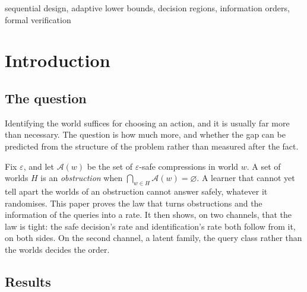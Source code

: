 \begin{IEEEkeywords}
sequential design, adaptive lower bounds, decision regions, information orders, formal
verification
\end{IEEEkeywords}

\section{Introduction}
\label{sec:intro}

\subsection{The question}

Identifying the world suffices for choosing an action, and it is usually far more than
necessary. The question is how much more, and whether the gap can be predicted from the
structure of the problem rather than measured after the fact.

Fix $\varepsilon$, and let $\mathcal A(w)$ be the set of $\varepsilon$-safe compressions in
world $w$. A set of worlds $H$ is an \emph{obstruction} when
$\bigcap_{w\in H}\mathcal A(w)=\varnothing$. A learner that cannot yet tell apart the worlds of
an obstruction cannot answer safely, whatever it randomises. This paper proves the law that
turns obstructions and the information of the queries into a rate. It then shows, on two
channels, that the law is tight: the safe decision's rate and identification's rate both follow
from it, on both sides. On the second channel, a latent family, the query class rather than the
worlds decides the order.

\subsection{Results}

